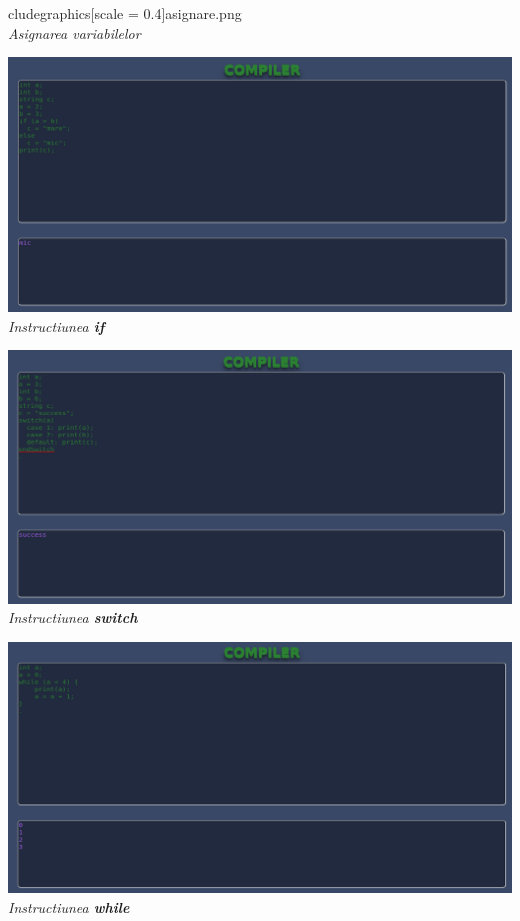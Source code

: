 \documentclass{article}
\begin{document}
\begin{center}
\inprimiti cludegraphics[scale = 0.4]{asignare.png}\\
\textit{Asignarea variabilelor}
\end{center}

\begin{center}
\includegraphics[scale = 0.4]{if.png}\\
\textit{Instructiunea \textbf{if}}
\end{center}

\begin{center}
\includegraphics[scale = 0.4]{switch.png}\\
\textit{Instructiunea \textbf{switch}}
\end{center}

\begin{center}
\includegraphics[scale = 0.4]{while.png}\\
\textit{Instructiunea \textbf{while}}
\end{center}
\end{document}
